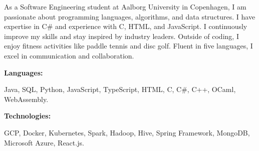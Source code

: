 \documentclass[9pt]{developercv} %
\begin{document}
\begin{minipage}[t]{0.46\textwidth}
As a Software Engineering student at Aalborg University in Copenhagen, I am passionate about programming languages, algorithms, and data structures. I have expertise in C\# and experience with C, HTML, and JavaScript. I continuously improve my skills and stay inspired by industry leaders. Outside of coding, I enjoy fitness activities like paddle tennis and disc golf. Fluent in five languages, I excel in communication and collaboration.

\end{minipage}
\hfill %
\begin{minipage}[t]{0.465\textwidth}
    \vspace{-6pt}
    
    \begin{minipage}[t]{0.2\textwidth}
        \textbf{Languages:}
    \end{minipage}
    \hfill
    \begin{minipage}[t]{0.73\textwidth}
        Java, SQL, Python, JavaScript, TypeScript, HTML, C, C\#, C++, OCaml, WebAssembly.
    \end{minipage}
    \vspace{4mm}
    
    \begin{minipage}[t]{0.2\textwidth}
        \textbf{Technologies:}
    \end{minipage}
    \hfill
    \begin{minipage}[t]{0.73\textwidth}
        GCP, Docker, Kubernetes, Spark, Hadoop, Hive, Spring Framework, MongoDB, Microsoft Azure, React.js.
    \end{minipage}
    \vspace{4mm}

\end{minipage}
\end{document}
